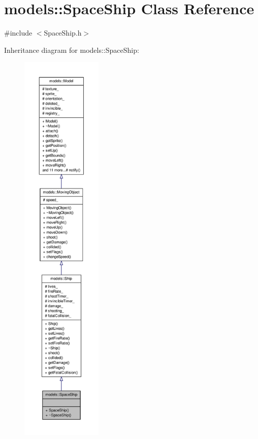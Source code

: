 \hypertarget{classmodels_1_1SpaceShip}{\section{models\-:\-:\-Space\-Ship \-Class \-Reference}
\label{d2/d9b/classmodels_1_1SpaceShip}
}


{\ttfamily \#include $<$\-Space\-Ship.\-h$>$}



\-Inheritance diagram for models\-:\-:\-Space\-Ship\-:\nopagebreak
\begin{figure}[H]
\begin{center}
\leavevmode
\includegraphics[height=550pt]{d6/d03/classmodels_1_1SpaceShip__inherit__graph}
\end{center}
\end{figure}


